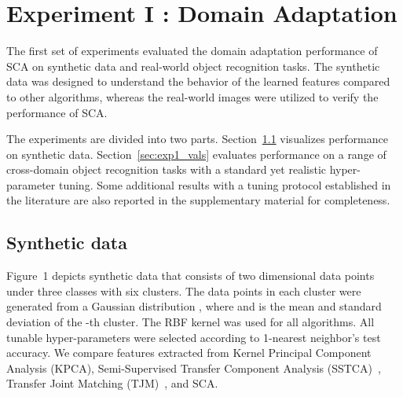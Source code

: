 \documentclass[10pt,journal,compsoc]{IEEEtran}
\begin{document}
\vspace{-1em}

\section{Experiment I : Domain Adaptation}
\label{sec:exp1}
The first set of experiments evaluated the domain adaptation performance of SCA on synthetic data and real-world object recognition tasks.
The synthetic data was designed to understand the behavior of the learned features compared to other algorithms, 
whereas the real-world images were utilized to verify the performance of SCA.

The experiments are divided into two parts.
Section~\ref{sec:toy} visualizes performance on synthetic data.
Section~\ref{sec:exp1_vals} evaluates performance on a range of cross-domain object recognition tasks with a standard yet realistic hyper-parameter tuning.
Some additional results with a tuning protocol established in the literature are also reported in the supplementary material for completeness.


\begin{figure*}[htp]
	\centering
	 \quad 
	 \quad 
	 \quad
	 \quad 
	\setcounter{subfigure}{0}
	 \quad 
	 \quad
	 \quad
	 \quad 
	\vspace{-1em}    
	\caption{\textbf{Visualization.}
	Projections of synthetic data onto the first two leading eigenvectors.
	Numbers in brackets indicate the classification accuracy on the target using 1-nearest neighbor (1NN).
	The top and bottom rows show the domains and classes respectively.
	}
	\label{fig:toy}
\end{figure*}
\vspace{-1em}
\subsection{Synthetic data}
\label{sec:toy}
Figure~1 depicts synthetic data that consists of two dimensional data points under three classes with six clusters.
The data points in each cluster were generated from a Gaussian distribution , 
where  and  is the mean and standard deviation of the -th cluster.
The RBF kernel  was used for all algorithms.
All tunable hyper-parameters were selected according to 1-nearest neighbor's test accuracy.
We compare features extracted from Kernel Principal Component Analysis (KPCA), Semi-Supervised Transfer Component Analysis (SSTCA)~\cite{Pan2011}, Transfer Joint Matching (TJM)~\cite{Long2014a}, and SCA.
\end{document}
